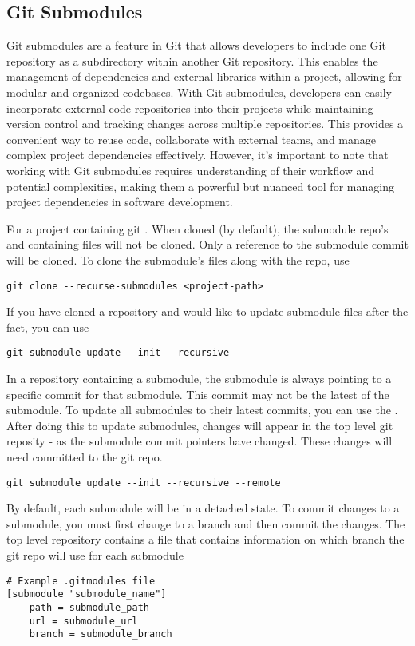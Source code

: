 \subsection{Git Submodules}

Git submodules are a feature in Git that allows developers to include one Git repository as a subdirectory within another Git repository. This enables the management of dependencies and external libraries within a project, allowing for modular and organized codebases. With Git submodules, developers can easily incorporate external code repositories into their projects while maintaining version control and tracking changes across multiple repositories. This provides a convenient way to reuse code, collaborate with external teams, and manage complex project dependencies effectively. However, it's important to note that working with Git submodules requires understanding of their workflow and potential complexities, making them a powerful but nuanced tool for managing project dependencies in software development.

\myindent For a project containing git . When cloned (by default), the submodule repo's and containing files will not be cloned. Only a reference to the submodule commit will be cloned. To clone the submodule's files along with the repo, use
\begin{lstlisting}[style=terminalstyle]
git clone --recurse-submodules <project-path>
\end{lstlisting}

If you have cloned a repository and would like to update submodule files after the fact, you can use
\begin{lstlisting}[style=terminalstyle]
git submodule update --init --recursive
\end{lstlisting}

In a repository containing a submodule, the submodule is always pointing to a specific commit for that submodule. This commit may not be the latest of the submodule. To update all submodules to their latest commits, you can use the . After doing this to update submodules, changes will appear in the top level git reposity - as the submodule commit pointers have changed. These changes will need committed to the git repo.
\begin{lstlisting}[style=terminalstyle]
git submodule update --init --recursive --remote
\end{lstlisting}

By default, each submodule will be in a detached  state. To commit changes to a submodule, you must first change to a branch and then commit the changes. The top level repository contains a  file that contains information on which branch the git repo will use for each submodule
\begin{lstlisting}
# Example .gitmodules file
[submodule "submodule_name"]
    path = submodule_path
    url = submodule_url
    branch = submodule_branch
\end{lstlisting}

